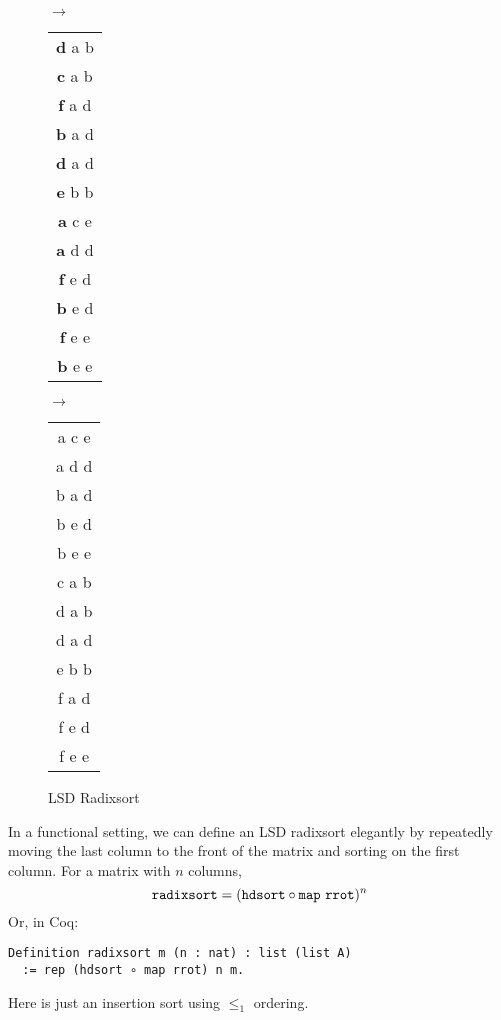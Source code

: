 \documentclass[sigplan,10pt,anonymous,review]{thesis}
\begin{document}
\begin{figure}[!hb]
\begin{tt}
    $\rightarrow$
    \begin{tabular}{c}
      \textbf{d} a b \\
      \textbf{c} a b \\
      \textbf{f} a d \\
      \textbf{b} a d \\
      \textbf{d} a d \\
      \textbf{e} b b \\
      \textbf{a} c e \\
      \textbf{a} d d \\
      \textbf{f} e d \\
      \textbf{b} e d \\
      \textbf{f} e e \\
      \textbf{b} e e
    \end{tabular}
    $\rightarrow$
    \begin{tabular}{c}
      a c e \\
      a d d \\
      b a d \\
      b e d \\
      b e e \\
      c a b \\
      d a b \\
      d a d \\
      e b b \\
      f a d \\
      f e d \\
      f e e
    \end{tabular}
  \end{tt}
  \caption{LSD Radixsort}
  \label{fig:lsd_radixsort}
\end{figure}

In a functional setting, we can define an LSD radixsort elegantly by
repeatedly moving the last column to the front of the matrix and
sorting on the first column. For a matrix with $n$ columns,
\begin{equation*}
  \texttt{\textup{radixsort}} = (\texttt{\textup{hdsort}} \circ \texttt{\textup{map}}~\texttt{\textup{rrot}})^n
\end{equation*}
Or, in Coq:
\begin{lstlisting}
Definition radixsort m (n : nat) : list (list A)
  := rep (hdsort ∘ map rrot) n m.
\end{lstlisting}
Here  is just an insertion sort using $\le_1$ ordering.
\end{document}
